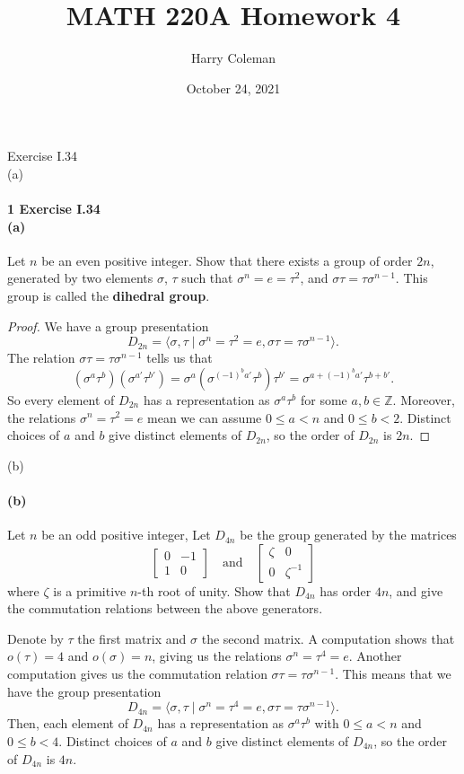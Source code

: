 \documentclass[12pt]{article}
\renewcommand{\maketitle}{\thispagestyle{title}}
\newlength{\myparskip}
\newenvironment{fullbox}{\begin{lrbox}{\savefullbox}\begin{minipage}{\dimexpr\textwidth-2\fboxsep\relax}\setlength{\parskip}{\myparskip}}{\end{minipage}\end{lrbox}\framebox[\textwidth]{\usebox{\savefullbox}}}
\newenvironment{pbox}[1][]{\begin{fullbox}\ifx#1\empty\else\paragraph{#1}\fi}{\end{fullbox}}
\newcommand{\isp}[1]{\quad\text{#1}\quad}
\newcommand{\Z}{\mathbb{Z}}
\newcommand{\<}{\langle}
\renewcommand{\>}{\rangle}
\newcommand{\mat}[1]{\begin{bmatrix}#1\end{bmatrix}}
\begin{document}
\title{MATH 220A Homework 4}
\author{Harry Coleman\makebox[0pt][r]{\raisebox{-0.25in}[0pt][0pt]{(worked with Joseph Sullivan, Gahl Shemy)}}}
\date{October 24, 2021}
\maketitle

\begin{pbox}[1 Exercise I.34 \\ (a)]
    Let $n$ be an even positive integer. Show that there exists a group of order $2n$, generated by two elements $\sigma$, $\tau$ such that $\sigma^n = e = \tau^2$, and $\sigma\tau = \tau\sigma^{n-1}$. This group is called the \textbf{dihedral group}.
\end{pbox}

\begin{proof}
    We have a group presentation
    \[
        D_{2n} = \<\sigma, \tau \mid \sigma^n = \tau^2 = e, \sigma\tau = \tau\sigma^{n-1}\>.
    \]
    The relation $\sigma\tau = \tau\sigma^{n-1}$ tells us that
    \[
        (\sigma^a\tau^b)(\sigma^{a'}\tau^{b'})
            = \sigma^a(\sigma^{(-1)^ba'}\tau^b)\tau^{b'}
            = \sigma^{a + (-1)^ba'}\tau^{b + b'}.
    \]
    So every element of $D_{2n}$ has a representation as $\sigma^a\tau^b$ for some $a, b \in \Z$. Moreover, the relations $\sigma^n = \tau^2 = e$ mean we can assume $0 \leq a < n$ and $0 \leq b < 2$. Distinct choices of $a$ and $b$ give distinct elements of $D_{2n}$, so the order of $D_{2n}$ is $2n$.


\end{proof}

\begin{pbox}[(b)]
    Let $n$ be an odd positive integer, Let $D_{4n}$ be the group generated by the matrices
    \[
        \mat{0 & -1 \\ 1 & 0} \isp{and} \mat{\zeta & 0 \\ 0 & \zeta^{-1}}
    \]
    where $\zeta$ is a primitive $n$-th root of unity. Show that $D_{4n}$ has order $4n$, and give the commutation relations between the above generators.
\end{pbox}

Denote by $\tau$ the first matrix and $\sigma$ the second matrix. A computation shows that $o(\tau) = 4$ and $o(\sigma) = n$, giving us the relations $\sigma^n = \tau^4 = e$. Another computation gives us the commutation relation $\sigma\tau = \tau\sigma^{n-1}$. This means that we have the group presentation
\[
    D_{4n} = \<\sigma, \tau \mid \sigma^n = \tau^4 = e, \sigma\tau = \tau\sigma^{n-1}\>.
\]
Then, each element of $D_{4n}$ has a representation as $\sigma^a\tau^b$ with $0 \leq a < n$ and $0 \leq b < 4$. Distinct choices of $a$ and $b$ give distinct elements of $D_{4n}$, so the order of $D_{4n}$ is $4n$.
\end{document}
